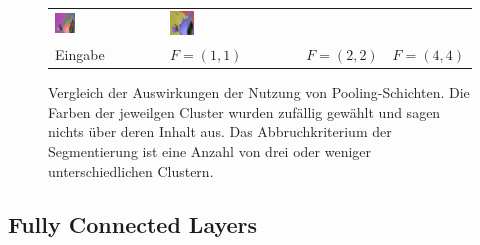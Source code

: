 \begin{figure}[h!]
\begin{tabular}{C{0.24\textwidth}C{0.24\textwidth}C{0.24\textwidth}C{0.24\textwidth}}
		\includegraphics[width=0.2\textwidth]{images/gen/pooling_layers/p03_04.png_2.png} &
		\includegraphics[width=0.2\textwidth]{images/gen/pooling_layers/p03_04.png_4.png} \\
		
		\hspace{2pt}\newline\centering Eingabe & 
		\hspace{2pt}\newline\centering $F=(1, 1)$ &
		\hspace{2pt}\newline\centering $F=(2, 2)$ &
		\hspace{2pt}\newline\centering $F=(4, 4)$ 
	\end{tabular}
	\caption{Vergleich der Auswirkungen der Nutzung von Pooling-Schichten. Die Farben der jeweilgen Cluster wurden zufällig gewählt und sagen nichts über deren Inhalt aus. Das Abbruchkriterium der Segmentierung ist eine Anzahl von drei oder weniger unterschiedlichen Clustern.}
	\label{fig:maxpool_comparision}
\end{figure}

\subsection{Fully Connected Layers}
\label{ssec:network_architecture_fully_connected}

